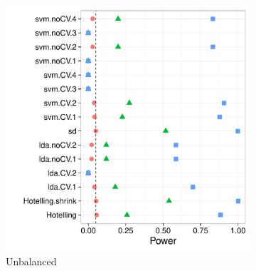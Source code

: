 \documentclass[12pt,a4paper]{article}
\begin{document}
\begin{figure}[h]
\centering
\label{fig:simulation_1}
\caption{\footnotesize
The power of a permutation test with various test statistics. 
The power on the $x$ axis. 
Effect are color and shape coded. They are assumed to be equal in all the $23$ dimensions, and vary over $0$ (red circle), $0.25$ (green triangle), and $0.5$ (blue square). 
The various statistics on the $y$ axis. Their details are given in Table~\ref{tab:collected}. 
Simulation code available at [TODO].}	

	\begin{subfigure}{.5\textwidth}
	  \centering
	  \includegraphics[width=1\linewidth]{"art/2016-07-26 20:55:48"}
	  \caption{Unbalanced}  %
	\label{fig:simulation_11}
	\end{subfigure}%
	\begin{subfigure}{.5\textwidth}
	  \centering

\end{subfigure}
\end{figure}
\end{document}
